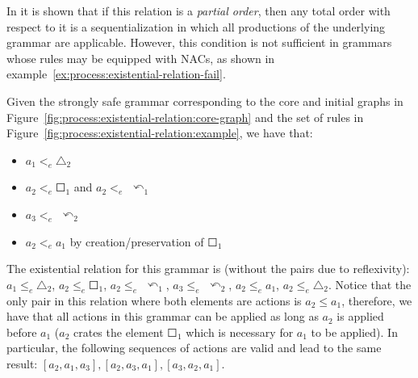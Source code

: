 In \cite{Corradini1996} it is shown that if this relation is a \emph{partial order}, then any total order with respect to it is a sequentialization in which all productions of the underlying grammar are applicable. However, this condition is not sufficient in grammars whose rules may be equipped with NACs, as shown in example~\ref{ex:process:existential-relation-fail}.

\begin{example}\label{ex:process:existential-relation} Given the strongly safe grammar corresponding to the core and initial graphs in Figure~\ref{fig:process:existential-relation:core-graph} and the set of rules in Figure~\ref{fig:process:existential-relation:example}, we have that:

\begin{itemize}
  \item $a_1 <_e \triangle_2$
  \item $a_2 <_e \Square_1$ and $a_2 <_e$ $\curvearrowleft_1$
  \item $a_3 <_e$ $\curvearrowleft_2$
  \item $a_2 <_e a_1$ by creation/preservation of $\Square_1$
\end{itemize}

  The existential relation for this grammar is (without the pairs due to reflexivity): $a_1 \leq_e \triangle_2$, $a_2 \leq_e \Square_1$, $a_2 \leq_e$ $\curvearrowleft_1$, $a_3 \leq_e$ $\curvearrowleft_2$, $a_2 \leq_e a_1$, $a_2 \leq_e \triangle_2$. Notice that the only pair in this relation where both elements are actions is \mbox{$a_2 \leq a_1$}, therefore, we have that all actions in this grammar can be applied as long as $a_2$ is applied before $a_1$ ($a_2$ crates the element $\Square_1$
  which is necessary for $a_1$ to be applied). In particular, the following sequences of actions are valid and lead to the same result: $[a_2,a_1,a_3],[a_2,a_3,a_1],[a_3,a_2,a_1]$.


\end{example}
